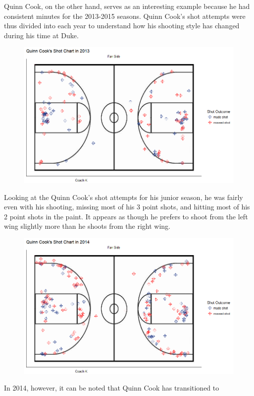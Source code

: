\documentclass[12pt,twoside]{dukestatscithesis}
\theoremstyle{definition}
\theoremstyle{definition}
\theoremstyle{definition}
\theoremstyle{remark}
\begin{document}
Quinn Cook, on the other hand, serves as an interesting example because
he had consistent minutes for the 2013-2015 seasons. Quinn Cook's shot
attempts were thus divided into each year to understand how his shooting
style has changed during his time at Duke.
\begin{figure}
\centering
\includegraphics{img/shotchart_quinncook2013.png}
\caption{}
\end{figure}
Looking at the Quinn Cook's shot attempts for his junior season, he was
fairly even with his shooting, missing most of his 3 point shots, and
hitting most of his 2 point shots in the paint. It appears as though he
prefers to shoot from the left wing slightly more than he shoots from
the right wing.
\begin{figure}
\centering
\includegraphics{img/shotchart_quinncook2014.png}
\caption{}
\end{figure}
In 2014, however, it can be noted that Quinn Cook has transitioned to
\end{document}
